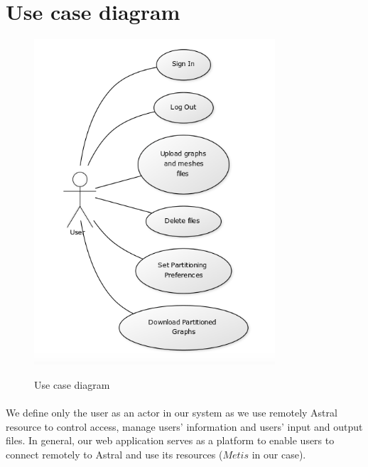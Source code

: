\documentclass{cranfieldChart}
\begin{document}
\section{Use case diagram}

\begin{figure}[h!]
\centering
\includegraphics[width=0.8\textwidth]{ressources/use-case}
\label{use-case}
\caption{Use case diagram}
\end{figure}

\paragraph{}
We define only the user as an actor in our system as we use remotely Astral resource to control access, manage users' information and users' input and output files. In general, our web application serves as a platform to enable users to connect remotely to Astral and use its resources ($Metis$ in our case).
\end{document}
